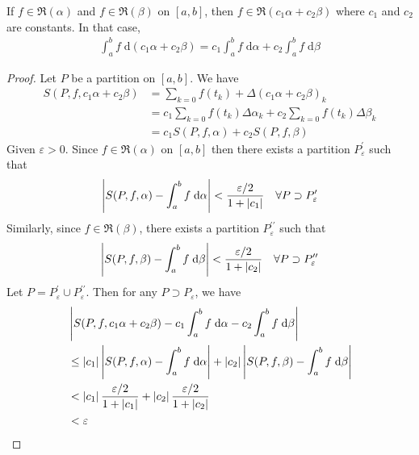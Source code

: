 \documentclass[thmcnt=section, 12pt]{my-elegantbook}
\begin{document}
\begin{theorem} \label{thm:19}
    If $f \in \mathfrak{R}(\alpha)$ and $f \in \mathfrak{R}(\beta)$ on $[a,b]$, then $f \in \mathfrak{R}(c_1 \alpha + c_2 \beta)$ where $c_1$ and $c_2$ are constants. In that case, 
    \begin{align*}
        \int_a^b f \; \mathrm{d}(c_1 \alpha + c_2 \beta)
        = c_1 \int_a^b f \; \mathrm{d}\alpha
        + c_2 \int_a^b f \; \mathrm{d}\beta
    \end{align*}
\end{theorem}

\begin{proof}
    Let $P$ be a partition on $[a,b]$. We have 
    \begin{align*}
        S(P, f, c_1 \alpha + c_2 \beta)
        &= \sum_{k=0} f(t_k) + \Delta(c_1 \alpha + c_2 \beta)_k \\ 
        &= c_1 \sum_{k=0} f(t_k) \Delta\alpha_k
        + c_2 \sum_{k=0} f(t_k) \Delta\beta_k \\ 
        &= c_1 S(P, f, \alpha) + c_2 S(P, f, \beta)
    \end{align*}
    Given $\varepsilon > 0$. Since $f \in \mathfrak{R}(\alpha)$ on $[a,b]$ then there exists a partition $P_\varepsilon^{\prime}$
    such that 
    \begin{align*}
        \left\lvert S(P, f, \alpha) - \int_a^b f \; \mathrm{d}\alpha \right\rvert < \frac{\varepsilon / 2}{1 + \left\lvert c_1 \right\rvert}
        \quad \forall P \supset P_\varepsilon^{\prime}
    \end{align*}
    Similarly, since $f \in \mathfrak{R}(\beta)$, there exists a partition $P_\varepsilon^{\prime\prime}$ such that 
    \begin{align*}
        \left\lvert S(P, f, \beta) - \int_a^b f \; \mathrm{d}\beta \right\rvert < \frac{\varepsilon / 2}{1 + \left\lvert c_2 \right\rvert}
        \quad \forall P \supset P_\varepsilon^{\prime\prime}
    \end{align*}
    Let $P = P_\varepsilon^{\prime} \cup P_\varepsilon^{\prime\prime}$. Then for any $P \supset P_\varepsilon$, we have 
    \begin{align*}
        &\left\lvert 
            S(P, f, c_1 \alpha + c_2 \beta) 
            - c_1 \int_a^b f \; \mathrm{d}\alpha
            - c_2 \int_a^b f \; \mathrm{d}\beta
         \right\rvert \\
        &\leq \left\lvert c_1 \right\rvert \left\lvert S(P,f,\alpha) - \int_a^b f \; \mathrm{d}\alpha \right\rvert
        + \left\lvert c_2 \right\rvert \left\lvert S(P,f,\beta) - \int_a^b f \; \mathrm{d}\beta \right\rvert \\ 
        &< \left\lvert c_1 \right\rvert \frac{\varepsilon / 2}{1 + \left\lvert c_1 \right\rvert}
        + \left\lvert c_2 \right\rvert \frac{\varepsilon / 2}{1 + \left\lvert c_2 \right\rvert} \\ 
        &< \varepsilon
    \end{align*}
\end{proof}
\end{document}
